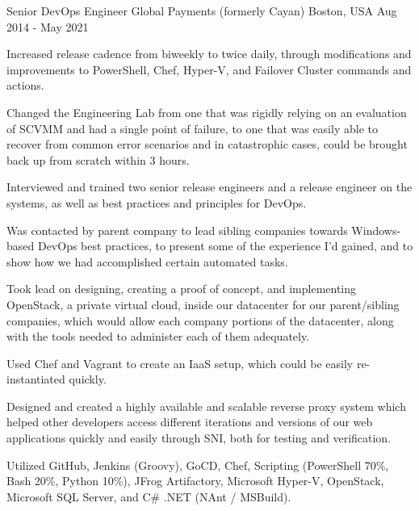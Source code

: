 \begin{cventries}
  \cventry
    {Senior DevOps Engineer} %
    {Global Payments (formerly Cayan)} %
    {Boston, USA} %
    {Aug 2014 - May 2021} %
    {
      \begin{cvitems} %
        \item {Increased release cadence from biweekly to twice daily, through modifications and improvements to PowerShell, Chef, Hyper-V, and Failover Cluster commands and actions.}
        \item {Changed the Engineering Lab from one that was rigidly relying on an evaluation of SCVMM and had a single point of failure, to one that was easily able to recover from common error scenarios and in catastrophic cases, could be brought back up from scratch within 3 hours.}
        \item {Interviewed and trained two senior release engineers and a release engineer on the systems, as well as best practices and principles for DevOps.}
        \item {Was contacted by parent company to lead sibling companies towards Windows-based DevOps best practices, to present some of the experience I'd gained, and to show how we had accomplished certain automated tasks.}
        \item {Took lead on designing, creating a proof of concept, and implementing OpenStack, a private virtual cloud, inside our datacenter for our parent/sibling companies, which would allow each company portions of the datacenter, along with the tools needed to administer each of them adequately.}
        \item {Used Chef and Vagrant to create an IaaS setup, which could be easily re-instantiated quickly.}
        \item {Designed and created a highly available and scalable reverse proxy system which helped other developers access different iterations and versions of our web applications quickly and easily through SNI, both for testing and verification.}
        \item {Utilized GitHub, Jenkins (Groovy), GoCD, Chef, Scripting (PowerShell 70\%, Bash 20\%, Python 10\%), JFrog Artifactory, Microsoft Hyper-V, OpenStack, Microsoft SQL Server, and C\# .NET (NAnt / MSBuild).}
      \end{cvitems}
    }


\end{cventries}
